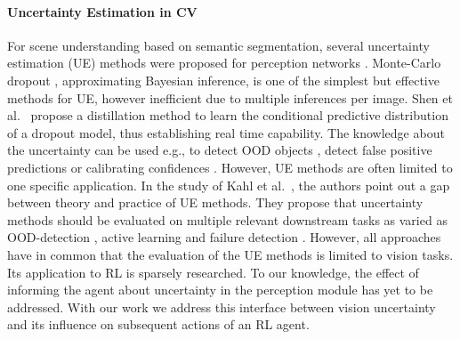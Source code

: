 \paragraph{Uncertainty Estimation in CV}
For scene understanding based on semantic segmentation, several uncertainty estimation (UE) methods were proposed for perception networks \cite{gal2016dropout,efron1987better}. 
Monte-Carlo dropout \cite{gal2016dropout,kendall2017uncertaintiesneedbayesiandeep}, approximating Bayesian inference, is one of the simplest but effective methods for UE, however inefficient due to multiple inferences per image. 
Shen et al.~\cite{shen2021real} propose a distillation method to learn the conditional predictive distribution of a dropout model, thus establishing real time capability. 
The knowledge about the uncertainty can  be used e.g., to detect OOD objects \cite{maag2024pixelwisegradientuncertaintyconvolutional}, detect false positive predictions \cite{9116288} or calibrating confidences \cite{naeini_mahdi_pakdaman_obtaining_2015}. However, UE methods are often limited to one specific application. 
In the study of Kahl et al.~\cite{kahl2024valuesframeworksystematicvalidation}, the authors point out a gap between theory and practice of UE methods. They propose that uncertainty methods should be evaluated on multiple relevant downstream tasks as varied as OOD-detection \cite{Oberdiek_2020_CVPR_Workshops,Cen_2021_ICCV,ancha2024deep}, active learning \cite{colling2020metaboxnewregionbased,tejaswi2019regionbasedal,pmlr-v235-franco24a} and failure detection \cite{9116288,yingda2020synthesizethencompare,chan2019metafusioncontrolledfalsenegativereduction}.
However, all approaches have in common that the evaluation of the UE methods is limited to vision tasks. Its application to RL is sparsely researched.
To our knowledge, the effect of informing the agent about uncertainty in the perception module 
has yet to be addressed.
With our work we address this interface between vision uncertainty and its influence on subsequent actions of an RL agent.